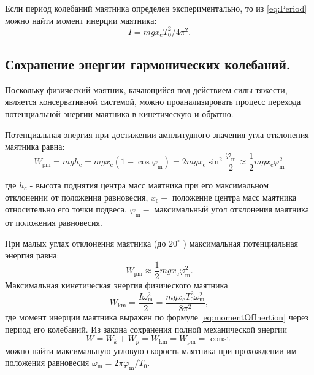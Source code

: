 Если период колебаний маятника определен экспериментально, то из
\eqref{eq:Period} можно найти момент инерции маятника:
\begin{equation}\label{eq:momentOfInertion}
    I=m g x_{\mathrm{c}} T_0^2 / 4 \pi^2 .
\end{equation}
\subsection{Сохранение энергии гармонических колебаний.}
Поскольку физический маятник, качающийся под действием силы тяжести, является консервативной системой, можно проанализировать процесс перехода потенциальной энергии маятника в кинетическую и обратно.

Потенциальная энергия при достижении амплитудного значения угла отклонения маятника равна:
\begin{equation}\label{eq:potentionEnergy}
    W_{\mathrm{pm}}=m g h_{\mathrm{c}}=m g x_{\mathrm{c}}\left(1-\cos \varphi_{\mathrm{m}}\right)=2 m g x_{\mathrm{c}} \sin ^2 \frac{\varphi_{\mathrm{m}}}{2} \approx \frac{1}{2} m g x_{\mathrm{c}} \varphi_{\mathrm{m}}^2
\end{equation}

где $h_c$ - высота поднятия центра масс маятника при его максимальном отклонении от положения равновесия, $x_{\mathrm{c}}-$ положение центра масс маятника относительно его точки подвеса, $\varphi_{\mathrm{m}}-$ максимальный угол отклонения маятника от положения равновесия.

При малых углах отклонения маятника (до $20^{\circ}$ ) максимальная потенциальная энергия равна:
\begin{equation}\label{eq:maxPotentionEnergy}
    W_{\mathrm{pm}} \approx \frac{1}{2} m g x_{\mathrm{c}} \varphi_{\mathrm{m}}^2 .
\end{equation}
Максимальная кинетическая энергия физического маятника
\begin{equation}\label{eq:maxKeneticEnergy}
    W_{\mathrm{km}}=\frac{I \omega_{\mathrm{m}}^2}{2}=\frac{m g x_{\mathrm{c}} T_0^2 \omega_{\mathrm{m}}^2}{8 \pi^2},
\end{equation}
где момент инерции маятника выражен по формуле \eqref{eq:momentOfInertion} через период его колебаний. Из закона сохранения полной механической энергии
\begin{equation}\label{eq:conservationOfEnergy}
    W=W_k+W_p=W_{\mathrm{km}}=W_{\mathrm{pm}}=\text { const }
\end{equation}
можно найти максимальную угловую скорость маятника при прохождении им положения равновесия $\omega_{\mathrm{m}}=2 \pi \varphi_{\mathrm{m}} / T_0$.

\newpage

